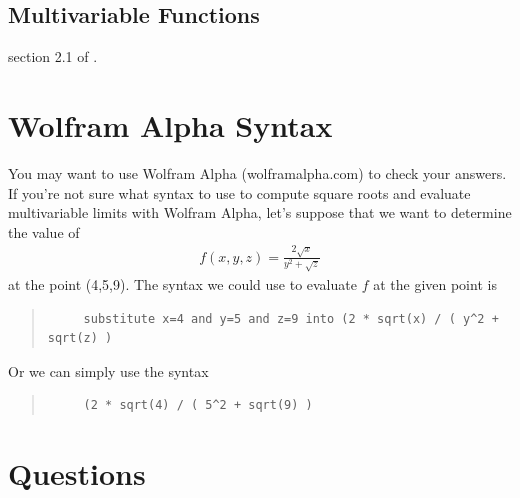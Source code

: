 %
%
%
\subsection{Multivariable Functions}
\From section 2.1 of \VCT.
\section*{Wolfram Alpha Syntax}
You may want to use Wolfram Alpha (wolframalpha.com) to check your answers. If you're not sure what syntax to use to compute square roots and evaluate multivariable limits with Wolfram Alpha, let's suppose that we want to determine the value of
\begin{align*} 
  f(x,y,z) = \frac{2 \sqrt{x}}{y^2 + \sqrt{z}}
\end{align*}
at the point (4,5,9). The syntax we could use to evaluate $f$ at the given point is
\begin{quote}
  \begin{verbatim}
     substitute x=4 and y=5 and z=9 into (2 * sqrt(x) / ( y^2 + sqrt(z) )
  \end{verbatim}
\end{quote}
Or we can simply use the syntax
\begin{quote}
  \begin{verbatim}
     (2 * sqrt(4) / ( 5^2 + sqrt(9) )
  \end{verbatim}
\end{quote}
\section*{Questions}

